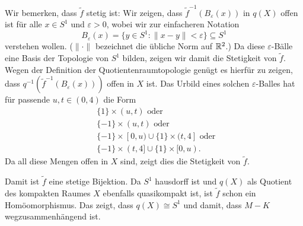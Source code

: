 \documentclass[a4paper,10pt]{article}
\begin{document}
\begin{center}
\end{center}

Wir bemerken, dass $\tilde{f}$ stetig ist: Wir zeigen, dass $\tilde{f}^{-1}(B_\varepsilon(x))$ in $q(X)$ offen ist für alle $x \in S^1$ und $\varepsilon > 0$, wobei wir zur einfacheren Notation
\[
 B_\varepsilon(x) = \{y \in S^1 : \|x-y\| < \varepsilon\} \subseteq S^1
\]
verstehen wollen. ($\|\cdot\|$ bezeichnet die übliche Norm auf $\mathbb{R}^2$.) Da diese $\varepsilon$-Bälle eine Basis der Topologie von $S^1$ bilden, zeigen wir damit die Stetigkeit von $\tilde{f}$. Wegen der Definition der Quotientenraumtopologie genügt es hierfür zu zeigen, dass $q^{-1}(\tilde{f}^{-1}(B_\varepsilon(x)))$ offen in $X$ ist. Das Urbild eines solchen $\varepsilon$-Balles hat für passende $u, t \in (0,4)$ die Form
\begin{align*}
 &\{1\} \times (u,t) \text{ oder } \\
 &\{-1\} \times (u,t) \text{ oder } \\
 &\{-1\} \times [0,u) \cup \{1\} \times (t,4] \text{ oder } \\
 &\{-1\} \times (t,4] \cup \{1\} \times [0,u).
\end{align*}
Da all diese Mengen offen in $X$ sind, zeigt dies die Stetigkeit von $\tilde{f}$.

Damit ist $\tilde{f}$ eine stetige Bijektion. Da $S^1$ hausdorff ist und $q(X)$ als Quotient des kompakten Raumes $X$ ebenfalls quasikompakt ist, ist $\tilde{f}$ schon ein Homöomorphismus. Das zeigt, dass $q(X) \cong S^1$ und damit, dass $M-K$ wegzusammenhängend ist.
\end{document}
